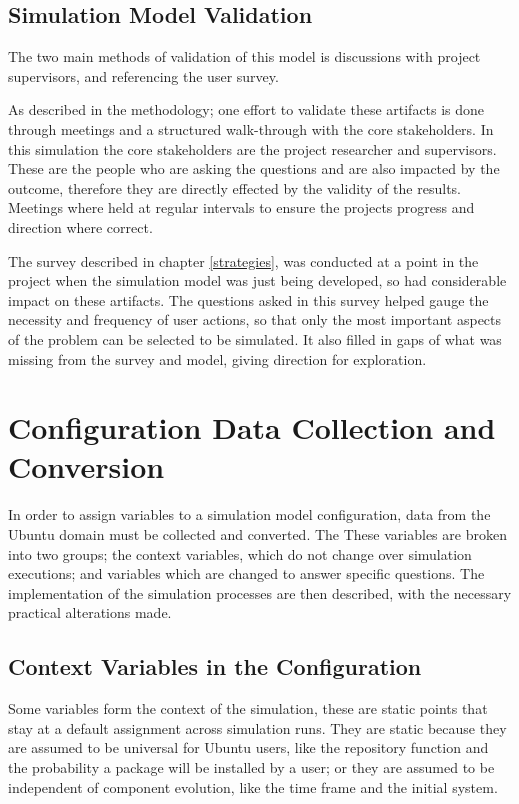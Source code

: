 \subsection{Simulation Model Validation}
The two main methods of validation of this model is discussions with project supervisors, and referencing the user survey. 

As described in the methodology; one effort to validate these artifacts is done through meetings and a structured walk-through with the core stakeholders.
In this simulation the core stakeholders are the project researcher and supervisors.
These are the people who are asking the questions and are also impacted by the outcome, therefore they are directly effected by the validity of the results.
Meetings where held at regular intervals to ensure the projects progress and direction where correct.

The survey described in chapter \ref{strategies}, 
was conducted at a point in the project when the simulation model was just being developed, so had considerable impact on these artifacts.
The questions asked in this survey helped gauge the necessity and frequency of user actions,
so that only the most important aspects of the problem can be selected to be simulated.
It also filled in gaps of what was missing from the survey and model, giving direction for exploration.



\section{Configuration Data Collection and Conversion}
\label{sim.collection}
In order to assign variables to a simulation model configuration, data from the Ubuntu domain must be collected and converted.
The 
These variables are broken into two groups; the context variables, which do not change over simulation executions; 
and variables which are changed to answer specific questions.
The implementation of the simulation processes are then described, with the necessary practical alterations made. 

\subsection{Context Variables in the Configuration}
Some variables form the context of the simulation, these are static points that stay at a default assignment across simulation runs.
They are static because they are assumed to be universal for Ubuntu users, like the repository function and the probability a package will be installed by a user;
or they are assumed to be independent of component evolution, like the time frame and the initial system.

